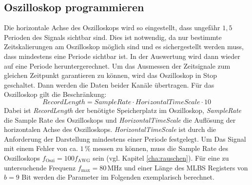 \documentclass[12pt,report,final,twoside,accentcolor=tud9b,bigchapter]{tudreport}
\begin{document}
\subsection{Oszilloskop programmieren}
Die horizontale Achse des Oszilloskops wird so eingestellt, dass ungefähr $1,5$ Perioden des Signals sichtbar sind. Dies ist notwendig, da nur bestimmte Zeitskalierungen am Oszilloskop möglich sind und es sichergestellt werden muss,
dass mindestens eine Periode sichtbar ist. In der Auswertung wird dann wieder auf eine Periode heruntergerechnet. Um das Ausmessen der Zeitsignale zum gleichen Zeitpunkt garantieren zu können, wird das Oszilloskop in Stop geschaltet. Dann werden die Daten beider Kanäle übertragen. 
Für das Oszilloskop gilt die Beschränkung:
\begin{equation}
RecordLength = SampleRate \cdot HorizontalTimeScale \cdot 10
\end{equation}
Dabei ist \textit{RecordLength} der benötigte Speicherplatz im Oszilloskop, \textit{SampleRate} die Sample Rate des Oszilloskops und \textit{HorizontalTimeScale} die Auflösung der horizontalen Achse des Oszilloskops.
\textit{HorizontalTimeScale} ist durch die Anforderung der Darstellung mindestens einer Periode festgelegt. Um Das Signal mit einem Fehler von ca. $1\,\mathrm{\%}$ messen zu können, muss die Sample Rate des Oszilloskops $f_{\mathrm{Oszi}}=100  f_{\mathrm{AWG}}$ sein (vgl. Kapitel \ref{cha:rauschen}). Für eine zu untersuchende Frequenz $f_\textrm{max}=80\,\mathrm{MHz}$ und einer Länge des MLBS Registers von $b=9$ Bit werden die Parameter im Folgenden exemplarisch berechnet.
\end{document}

